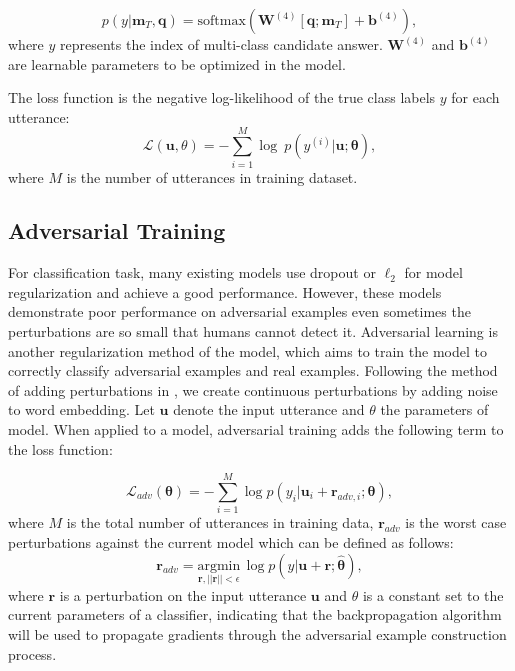 \documentclass[conference]{IEEEtran}
\begin{document}
	\begin{equation}
	p(y|\mathbf{m}_T, \mathbf{q})=\mathrm{softmax}(\mathbf{W}^{(4)}[\mathbf{q};\mathbf{m}_T]+\mathbf{b}^{(4)}),
	\end{equation}
	where $y$ represents the index of multi-class candidate answer. $\mathbf{W}^{(4)}$ and $\mathbf{b}^{(4)}$ are learnable parameters to be optimized in the model.
	
	The loss function is the negative log-likelihood of the true class labels $y$ for each utterance:
	\begin{equation}
	\mathcal{L}(\mathbf{u},\theta) =-\sum_{i=1}^{M}\log\ p(y^{(i)}|\mathbf{u}; \mathbf{\theta}),
	\end{equation}
	where $M$ is the number of utterances in training dataset.
	\subsection{Adversarial Training} \label{adversarial}
	For classification task, many existing models use dropout or $\ell_2$ for model regularization and achieve a good performance. However, these models demonstrate poor performance on adversarial examples even sometimes the perturbations are so small that humans cannot detect it. Adversarial learning is another regularization method of the model, which aims to train the model to correctly classify adversarial examples and real examples. Following the method of adding perturbations in \cite{miyato2016adversarial}, we create continuous perturbations by adding noise to word embedding. Let $\mathbf{u}$ denote the input utterance and $\theta$ the parameters of model. When applied to a model, adversarial training adds the following term to the loss function:
	
	\begin{equation}
	\mathcal{L}_{adv}(\mathbf{\theta}) = -\sum_{i=1}^{M}\log p(y_i|\mathbf{u}_i+\mathbf{r}_{adv,i}; \mathbf{\theta}),
	\end{equation}
	where $M$ is the total number of utterances in training data, $\mathbf{r}_{adv}$ is the worst case perturbations against the current model which can be defined as follows:
	\begin{equation}
	\mathbf{r}_{adv} = \underset{\mathbf{r},||\mathbf{r}||<\epsilon}{\mathrm{argmin}}\, \log p(y|\mathbf{u}+\mathbf{r};\hat{\mathbf{\theta}}) \label{r_adv},
	\end{equation}
	where $\mathbf{r}$ is a perturbation on the input utterance $\mathbf{u}$ and $\hat{\theta}$ is a constant set to the current parameters of a classifier, indicating that the backpropagation algorithm will be used to propagate gradients through the adversarial example construction process.
	
\end{document}
